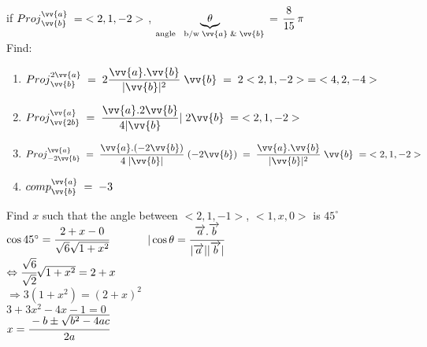 \noindent{\color{smalt(darkpowderblue)}\rule{\linewidth}{.2mm}}
\begin{example}
if ${Proj}_{\vv{b}}^{\vv{a}} \; = \;<2 , 1 , -2>$ , $\underbrace{\theta}_{\text{angle \; b/w} \; \vv{a} \; \& \;  \vv{b}}$ = $\cfrac{8}{15} \; \pi$\\
Find:
\begin{enumerate}
\item ${Proj}_{\vv{b}}^{2\vv{a}} \; = \; 2 \dfrac{\vv{a} . \vv{b}}{|\vv{b}|^2} \; \vv{b} \; = \; 2<2,1,-2> \; = \;<4 , 2 , -4>$
\item ${Proj}_{\vv{2b}}^{\vv{a}} \; = \; \dfrac{\vv{a} . 2\vv{b}}{4 |\vv{b}}| \; 2\vv{b} \; = \;<2,1,-2>$\\
\item ${Proj}_{-2\vv{b}}^{\vv{a}} \; = \; \dfrac{\vv{a} . (-2\vv{b})}{4 \; |\vv{b}|} \; (-2\vv{b}) \; = \; \dfrac{\vv{a} . \vv{b}}{|\vv{b}|^2} \; \vv{b} \; = \;<2 , 1 , 
-2>$\\
\item ${comp}_{\vv{b}}^{\vv{a}} \; = \; -3$
\end{enumerate}
\end{example}
\noindent{\color{smalt(darkpowderblue)}\rule{\linewidth}{.2mm}}
\begin{example}
Find $x$ such that the angle between $<2,1,-1>$, $<1,x,0>$ is $45^\circ$ \\
$\cos{45^\circ}=\cfrac{2+x-0}{\sqrt{6}\sqrt{1+x^2}}$~~~~~~
$|\cos{\theta}=\cfrac{\overrightarrow{a}.\overrightarrow{b}}{|\overrightarrow{a}||\overrightarrow{b}|}$\\
$\Leftrightarrow\cfrac{\sqrt{6}}{\sqrt{2}}\sqrt{1+x^2}=2+x$\\
$\Rightarrow3(1+x^2)=(2+x)^2$\\
$3+3x^2-4x-1=0$\\
$x=\cfrac{-b\pm\sqrt{b^2-4ac}}{2a}$
\end{example}
\noindent{\color{smalt(darkpowderblue)}\rule{\linewidth}{.2mm}}

